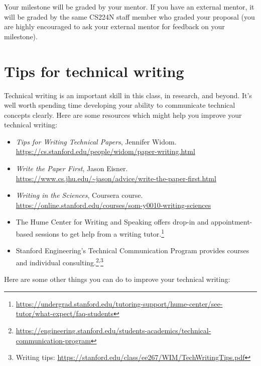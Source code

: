 \documentclass[11pt,a4paper]{article}
\begin{document}
Your milestone will be graded by your mentor. If you have an external mentor, it will be graded by the same CS224N staff member who graded your proposal (you are highly encouraged to ask your external mentor for feedback on your milestone).


\section{Tips for technical writing}

Technical writing is an important skill in this class, in research, and beyond. It's well worth spending time developing your ability to communicate technical concepts clearly. Here are some resources which might help you improve your technical writing:

\begin{itemize}[nosep]
    \item \textit{Tips for Writing Technical Papers}, Jennifer Widom.\\
    \url{https://cs.stanford.edu/people/widom/paper-writing.html}
    \item \textit{Write the Paper First}, Jason Eisner.\\
    \url{https://www.cs.jhu.edu/~jason/advice/write-the-paper-first.html}
    \item \textit{Writing in the Sciences}, Coursera course.\\
    \url{https://online.stanford.edu/courses/som-y0010-writing-sciences}
    \item The Hume Center for Writing and Speaking offers drop-in and appointment-based sessions to get help from a writing tutor.\footnote{\url{https://undergrad.stanford.edu/tutoring-support/hume-center/see-tutor/what-expect/faq-students}}
    \item Stanford Engineering's Technical Communication Program provides courses and individual consulting.\footnote{\url{https://engineering.stanford.edu/students-academics/technical-communication-program}}\textsuperscript{,}\footnote{Writing tips: \url{https://stanford.edu/class/ee267/WIM/TechWritingTips.pdf}}
\end{itemize}

Here are some other things you can do to improve your technical writing:
\end{document}
